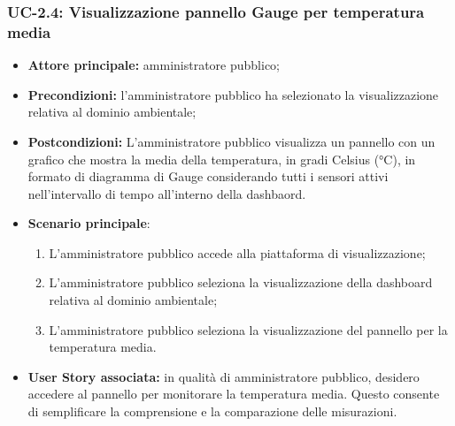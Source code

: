\documentclass[8pt]{article}
\begin{document}
\subsubsection*{UC-2.4: Visualizzazione pannello Gauge per temperatura media}
\begin{itemize}
    \item \textbf{Attore principale:} amministratore pubblico;
    \item \textbf{Precondizioni: }l’amministratore pubblico ha selezionato la visualizzazione
        relativa al dominio ambientale;
    \item \textbf{Postcondizioni:} L’amministratore pubblico visualizza un pannello con un grafico
        che mostra la media della temperatura, in gradi Celsius (°C), in formato di diagramma di
        Gauge considerando tutti i sensori attivi nell'intervallo di tempo all'interno della dashbaord.
    \item \textbf{Scenario principale}:
    \begin{enumerate}
    \item L’amministratore pubblico accede alla piattaforma di visualizzazione;
    \item L’amministratore pubblico seleziona la visualizzazione della dashboard relativa al dominio
        ambientale; 
    \item L’amministratore pubblico seleziona la visualizzazione del pannello per la temperatura
        media.
    \end{enumerate}
\item \textbf{User Story associata:} in qualità di amministratore pubblico, desidero accedere al
        pannello per monitorare la temperatura media. Questo consente di semplificare la comprensione e la comparazione delle misurazioni.
\end{itemize}
\end{document}
